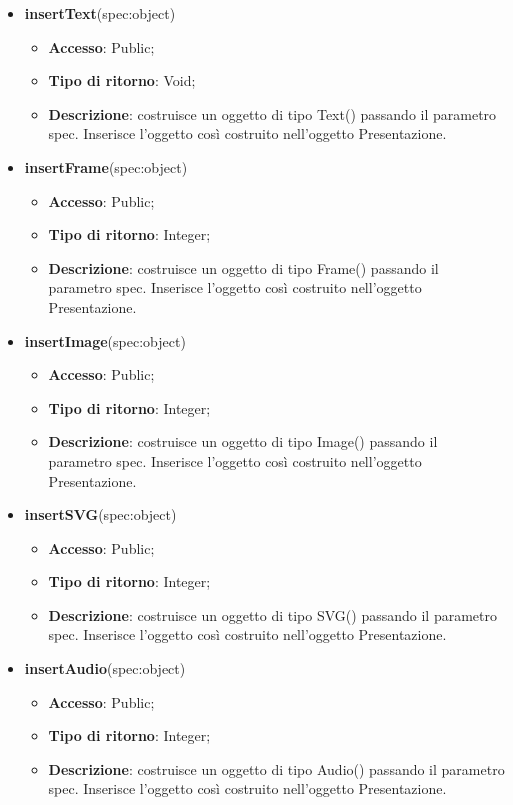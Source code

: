 {\begin{itemize}
\begin{itemize}
			\end{itemize}
			\item \textbf{insertText}(spec:object)
			\begin{itemize}
				\item \textbf{Accesso}: Public;
				\item \textbf{Tipo di ritorno}: Void;
				\item \textbf{Descrizione}: costruisce un oggetto di tipo Text() passando il parametro spec. Inserisce l’oggetto così costruito nell’oggetto Presentazione.
			\end{itemize}
			\item \textbf{insertFrame}(spec:object)
			\begin{itemize}
				\item \textbf{Accesso}: Public;
				\item \textbf{Tipo di ritorno}: Integer;
				\item \textbf{Descrizione}: costruisce un oggetto di tipo Frame() passando il parametro spec. Inserisce l’oggetto così costruito nell’oggetto Presentazione.
			\end{itemize}
			\item \textbf{insertImage}(spec:object)
			\begin{itemize}
				\item \textbf{Accesso}: Public;
				\item \textbf{Tipo di ritorno}: Integer;
				\item \textbf{Descrizione}: costruisce un oggetto di tipo Image() passando il parametro spec. Inserisce l’oggetto così costruito nell’oggetto Presentazione.
			\end{itemize}
			\item \textbf{insertSVG}(spec:object)
			\begin{itemize}
				\item \textbf{Accesso}: Public;
				\item \textbf{Tipo di ritorno}: Integer;
				\item \textbf{Descrizione}: costruisce un oggetto di tipo SVG() passando il parametro spec. Inserisce l’oggetto così costruito nell’oggetto Presentazione.
			\end{itemize}
			\item \textbf{insertAudio}(spec:object)
			\begin{itemize}
				\item \textbf{Accesso}: Public;
				\item \textbf{Tipo di ritorno}: Integer;
				\item \textbf{Descrizione}: costruisce un oggetto di tipo Audio() passando il parametro spec. Inserisce l’oggetto così costruito nell’oggetto Presentazione.

\end{itemize}
\end{itemize}}
